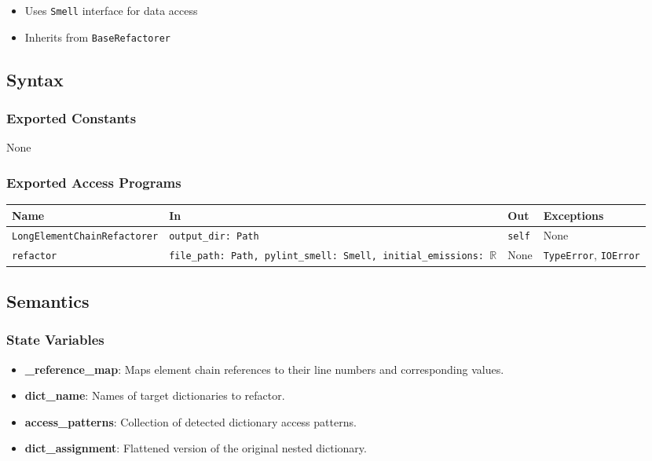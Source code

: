 \documentclass[12pt, titlepage]{article}
\begin{document}
\begin{itemize}
\item Uses \texttt{Smell} interface for data access
\item Inherits from \texttt{BaseRefactorer}
\end{itemize}

\subsection{Syntax}

\subsubsection{Exported Constants}
None

\subsubsection{Exported Access Programs}


\begin{center}
\begin{tabularx}{\linewidth}{|l|>{\raggedright\arraybackslash}X|l|l|}
\hline
\textbf{Name} & \textbf{In} & \textbf{Out} & \textbf{Exceptions} \\
\hline
\texttt{LongElementChainRefactorer} & \texttt{output\_dir: Path} & \texttt{self} & None \\
\hline
\texttt{refactor} & \texttt{file\_path: Path, pylint\_smell: Smell, initial\_emissions: $\mathbb{R}$} & None & \texttt{TypeError}, \texttt{IOError} \\
\hline
\end{tabularx}
\end{center}

\subsection{Semantics}

\subsubsection{State Variables}

\begin{itemize}
\item \textbf{\_reference\_map}: Maps element chain references to their line numbers and corresponding values.
\item \textbf{dict\_name}: Names of target dictionaries to refactor.
\item \textbf{access\_patterns}: Collection of detected dictionary access patterns.
\item \textbf{dict\_assignment}: Flattened version of the original nested dictionary.
\end{itemize}
\end{document}
